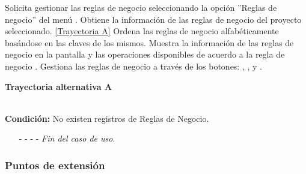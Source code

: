 \begin{UCtrayectoria}
	\UCpaso[\UCactor] Solicita gestionar las reglas de negocio seleccionando la opción ''Reglas de negocio'' del menú .
	\UCpaso[\UCsist] Obtiene la información de las reglas de negocio del proyecto seleccionado. \hyperlink{CU8:TAA}{[Trayectoria A]}
	\UCpaso[\UCsist] Ordena las reglas de negocio alfabéticamente basándose en las claves de los mismos.
	\UCpaso[\UCsist] Muestra la información de las reglas de negocio en la pantalla  y las operaciones disponibles de acuerdo a la regla de negocio .\label{CU8-P4}
	\UCpaso[\UCactor] Gestiona las reglas de negocio a través de los botones: , \editar , \eliminar y . 
\end{UCtrayectoria}		
\hypertarget{CU8:TAA}{\textbf{Trayectoria alternativa A}}\\
\noindent \textbf{Condición:} No existen registros de Reglas de Negocio.
\begin{enumerate}
	\UCpaso[\UCsist] Muestra el mensaje  en la pantalla  para indicar que no hay registros de reglas de negocio para mostrar. \label{CU8-TA1}
	\UCpaso[\UCactor] Gestiona las reglas de negocio a través del botón: . 
	\item[- -] - - {\em {Fin del caso de uso}}.%
\end{enumerate}


\subsubsection{Puntos de extensión}

